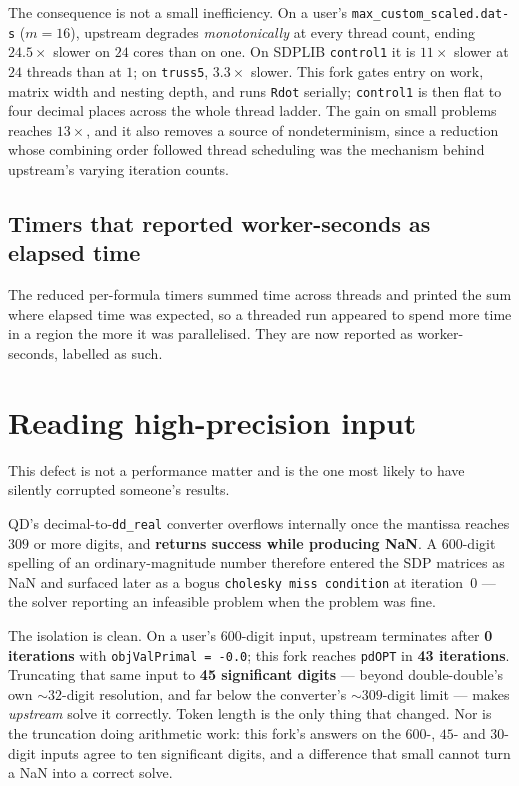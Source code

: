 \documentclass[11pt]{article}
\newcommand{\code}[1]{\texttt{#1}}
\begin{document}
The consequence is not a small inefficiency. On a user's \code{max\_custom\_scaled.dat-s}
($m{=}16$), upstream degrades \emph{monotonically} at every thread count, ending $24.5\times$
slower on $24$ cores than on one. On SDPLIB \code{control1} it is $11\times$ slower at $24$
threads than at $1$; on \code{truss5}, $3.3\times$ slower. This fork gates entry on work, matrix
width and nesting depth, and runs \code{Rdot} serially; \code{control1} is then flat to four
decimal places across the whole thread ladder. The gain on small problems reaches $13\times$, and
it also removes a source of nondeterminism, since a reduction whose combining order followed
thread scheduling was the mechanism behind upstream's varying iteration counts.

\subsection{Timers that reported worker-seconds as elapsed time}

The reduced per-formula timers summed time across threads and printed the sum where elapsed time
was expected, so a threaded run appeared to spend more time in a region the more it was
parallelised. They are now reported as worker-seconds, labelled as such.

\section{Reading high-precision input}

This defect is not a performance matter and is the one most likely to have silently corrupted
someone's results.

QD's decimal-to-\code{dd\_real} converter overflows internally once the mantissa reaches $309$ or
more digits, and \textbf{returns success while producing NaN}. A $600$-digit spelling of an
ordinary-magnitude number therefore entered the SDP matrices as NaN and surfaced later as a bogus
\code{cholesky miss condition} at iteration~$0$ --- the solver reporting an infeasible problem
when the problem was fine.

The isolation is clean. On a user's $600$-digit input, upstream terminates after
\textbf{0 iterations} with \code{objValPrimal = -0.0}; this fork reaches \code{pdOPT} in
\textbf{43 iterations}. Truncating that same input to \textbf{45 significant digits} --- beyond
double-double's own $\sim$$32$-digit resolution, and far below the converter's $\sim$$309$-digit
limit --- makes \emph{upstream} solve it correctly. Token length is the only thing that changed.
Nor is the truncation doing arithmetic work: this fork's answers on the $600$-, $45$- and
$30$-digit inputs agree to ten significant digits, and a difference that small cannot turn a NaN
into a correct solve.
\end{document}
